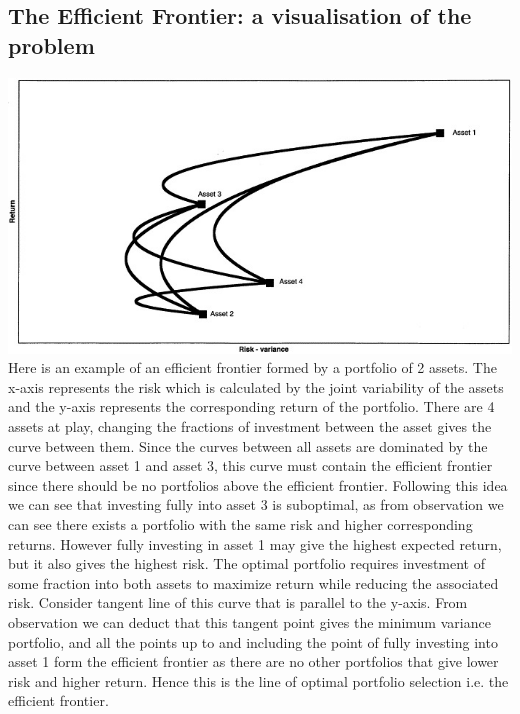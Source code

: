 \documentclass[11pt]{article}
\begin{document}
\subsection{The Efficient Frontier: a visualisation of the problem}
\includegraphics[scale=0.5]{EF} \citep{https://doi.org/10.1111/1540-6229.00689}
\newline Here is an example of an efficient frontier formed by a portfolio of 2 assets. The x-axis represents the risk which is calculated by the joint variability of the assets and the y-axis represents the corresponding return of the portfolio. There are 4 assets at play, changing the fractions of investment between the asset gives the curve between them. Since the curves between all assets are dominated by the curve between asset 1 and asset 3, this curve must contain the efficient frontier since there should be no portfolios above the efficient frontier. Following this idea we can see that investing fully into asset 3 is suboptimal, as from observation we can see there exists a portfolio with the same risk and higher corresponding returns. However fully investing in asset 1 may give the highest expected return, but it also gives the highest risk. The optimal portfolio requires investment of some fraction into both assets to maximize return while reducing the associated risk. Consider tangent line of this curve that is parallel to the y-axis. From observation we can deduct that this tangent point gives the minimum variance portfolio, and all the points up to and including the point of fully investing into asset 1 form the efficient frontier as there are no other portfolios that give lower risk and higher return. Hence this is the line of optimal portfolio selection i.e. the efficient frontier.
\end{document}
